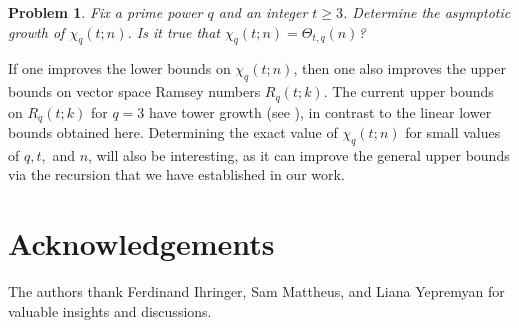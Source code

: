 \documentclass[11pt]{article}
\theoremstyle{plain}
\newtheorem{problem}{Problem}
\begin{document}
\begin{problem}
Fix a prime power $q$ and an integer $t\ge 3$.
Determine the asymptotic growth of $\chi_q(t;n)$.
Is it true that $\chi_q(t;n)=\Theta_{t,q}(n)$?
\end{problem}

If one improves the lower bounds on $\chi_q(t;n)$, then one also improves the upper bounds on vector space Ramsey numbers $R_q(t;k)$.
The current upper bounds on $R_q(t;k)$ for $q=3$ have tower growth (see \cite{Frederickson2023}), in contrast to the linear lower bounds obtained here.   
Determining the exact value of $\chi_q(t; n)$ for small values of $q, t,$ and $n$, will also be interesting, as it can improve the general upper bounds via the recursion that we have established in our work. 

\section*{Acknowledgements}
The authors thank Ferdinand Ihringer, Sam Mattheus, and Liana Yepremyan for valuable insights and discussions.
\end{document}
